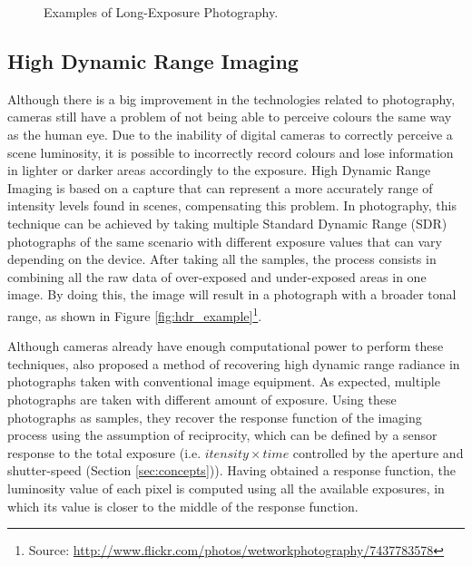 \begin{figure}[htbp]
        \centering
  \caption{Examples of Long-Exposure Photography. \cite{kamps2012rules}}
  \label{fig:long_exposure_example}
\end{figure}

\subsection{High Dynamic Range Imaging}

Although there is a big improvement in the technologies related to photography, cameras still have a problem of not being able to perceive colours the same way as the human eye. Due to the inability of digital cameras to correctly perceive a scene luminosity, it is possible to incorrectly record colours and lose information in lighter or darker areas accordingly to the exposure. High Dynamic Range Imaging is based on a capture that can represent a more accurately range of intensity levels found in scenes, compensating this problem.
In photography, this technique can be achieved by taking multiple Standard Dynamic Range (SDR) photographs of the same scenario with different exposure values that can vary depending on the device. After taking all the samples, the process consists in combining all the raw data of over-exposed and under-exposed areas in one image. By doing this, the image will result in a photograph with a broader tonal range, as shown in Figure \ref{fig:hdr_example}\footnote{Source: \url{http://www.flickr.com/photos/wetworkphotography/7437783578}}.

Although cameras already have enough computational power to perform these techniques, \citeauthor{debevec2008recovering} \cite{debevec2008recovering} also proposed a method of recovering high dynamic range radiance in photographs taken with conventional image equipment. 
As expected, multiple photographs are taken with different amount of exposure. Using these photographs as samples, they recover the response function of the imaging process using the assumption of reciprocity, which can be defined by a sensor response to the total exposure (i.e. $itensity \times time$ controlled by the aperture and shutter-speed (Section \ref{sec:concepts})).
Having obtained a response function, the luminosity value of each pixel is computed using all the available exposures, in which its value is closer to the middle of the response function.

